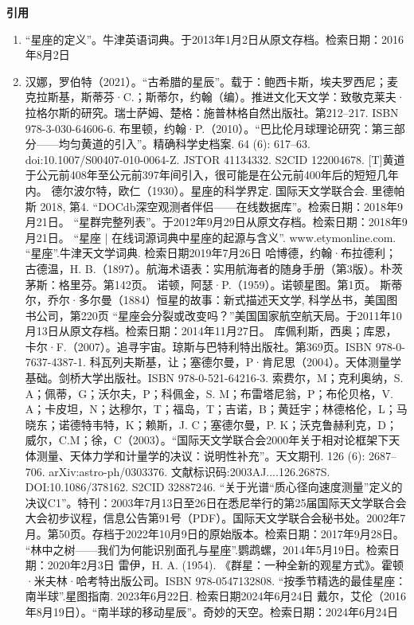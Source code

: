\begin{itemize}
\textbf{引用}
\begin{enumerate}
\item “星座的定义”。牛津英语词典。于2013年1月2日从原文存档。检索日期：2016年8月2日
\item 汉娜，罗伯特（2021）。“古希腊的星辰”。载于：鲍西卡斯，埃夫罗西尼；麦克拉斯基，斯蒂芬·C.；斯蒂尔，约翰（编）。推进文化天文学：致敬克莱夫·拉格尔斯的研究。瑞士萨姆、楚格：施普林格自然出版社。第212–217. ISBN 978-3-030-64606-6.
 布里顿，约翰·P.（2010）。“巴比伦月球理论研究：第三部分——均匀黄道的引入”。精确科学史档案. 64 (6): 617–63. doi:10.1007/S00407-010-0064-Z. JSTOR 41134332. S2CID 122004678. [T]黄道于公元前408年至公元前397年间引入，很可能是在公元前400年后的短短几年内。
 德尔波尔特，欧仁（1930）。星座的科学界定. 国际天文学联合会.
 里德帕斯 2018, 第4.
 “DOCdb深空观测者伴侣——在线数据库”。检索日期：2018年9月21日。
 “星群完整列表”。于2012年9月29日从原文存档。检索日期：2018年9月21日。
 “星座 | 在线词源词典中星座的起源与含义”. www.etymonline.com.
 “星座”.牛津天文学词典. 检索日期2019年7月26日
 哈博德，约翰·布拉德利；古德温，H. B.（1897）。航海术语表：实用航海者的随身手册（第3版）。朴茨茅斯：格里芬。第142页。
 诺顿，阿瑟·P.（1959）。诺顿星图。第1页。
 斯蒂尔，乔尔·多尔曼（1884）恒星的故事：新式描述天文学, 科学丛书，美国图书公司，第220页
 “星座会分裂或改变吗？”美国国家航空航天局。于2011年10月13日从原文存档。检索日期：2014年11月27日。
 库佩利斯，西奥；库恩，卡尔·F.（2007）。追寻宇宙。琼斯与巴特利特出版社。第369页。ISBN 978-0-7637-4387-1.
 科瓦列夫斯基，让；塞德尔曼，P·肯尼思（2004）。天体测量学基础。剑桥大学出版社。ISBN 978-0-521-64216-3.
 索费尔，M；克利奥纳，S. A；佩蒂，G；沃尔夫，P；科佩金，S. M；布雷塔尼翁，P；布伦贝格，V. A；卡皮坦，N；达穆尔，T；福岛，T；吉诺，B；黄廷宇；林德格伦，L；马晓东；诺德特韦特，K；赖斯，J. C；塞德尔曼，P. K；沃克鲁赫利克，D；威尔，C.M；徐，C（2003）。“国际天文学联合会2000年关于相对论框架下天体测量、天体力学和计量学的决议：说明性补充”。天文期刊. 126 (6): 2687–706. arXiv:astro-ph/0303376. 文献标识码:2003AJ....126.2687S. DOI:10.1086/378162. S2CID 32887246.
 “关于光谱“质心径向速度测量”定义的决议C1”。特刊：2003年7月13日至26日在悉尼举行的第25届国际天文学联合会大会初步议程，信息公告第91号（PDF）。国际天文学联合会秘书处。2002年7月。第50页。存档于2022年10月9日的原始版本。检索日期：2017年9月28日。
 “林中之树——我们为何能识别面孔与星座”.鹦鹉螺，2014年5月19日。检索日期：2020年2月3日
 雷伊，H. A. (1954). 《群星：一种全新的观星方式》。霍顿·米夫林·哈考特出版公司。ISBN 978-0547132808.
 “按季节精选的最佳星座：南半球”.星图指南. 2023年6月22日. 检索日期2024年6月24日
 戴尔，艾伦（2016年8月19日）。“南半球的移动星辰”。奇妙的天空。检索日期：2024年6月24日

\end{enumerate}
\end{itemize}

